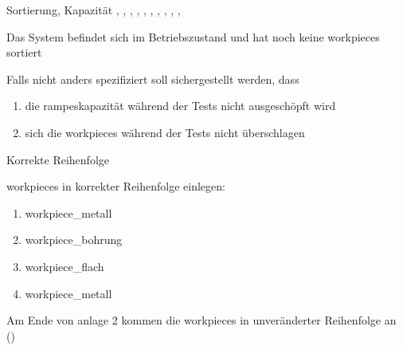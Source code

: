 \begin{abntest}{Sortierung, Kapazität}{
    ,
    ,
    ,
    ,
    ,
    , %
    ,
    ,
    ,
    ,
}{
    \item Das System befindet sich im Betriebszustand und hat noch keine \glspl{workpiece} sortiert
    \item Falls nicht anders spezifiziert soll sichergestellt werden, dass
    \begin{enumerate}
        \item die \glspl{rampe}kapazität während der Tests nicht ausgeschöpft wird
        \item sich die \glspl{workpiece} während der Tests nicht überschlagen
    \end{enumerate}
}
    \label{abntest-sortierung-kapazitaet}

    \begin{ablauf}{Korrekte Reihenfolge}
        \item \Glspl{workpiece} in korrekter Reihenfolge einlegen:
        \begin{enumerate}
            \item \gls{workpiece_metall}
            \item \gls{workpiece_bohrung}
            \item \gls{workpiece_flach}
            \item \gls{workpiece_metall}
        \end{enumerate}
    \end{ablauf}

    \erwartung
    Am Ende von \gls{anlage} 2 kommen die \Glspl{workpiece} in
    unveränderter Reihenfolge an ()


\end{abntest}

